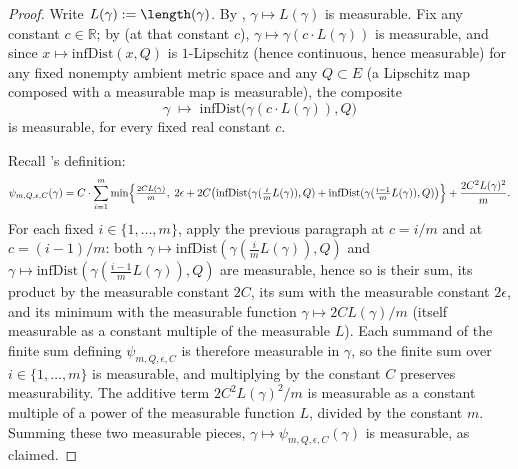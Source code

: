 \begin{proof}
  Write $L(\gamma) := \length(\gamma)$. By , $\gamma \mapsto L(\gamma)$
  is measurable. Fix any constant $c \in \mathbb{R}$; by  (at
  that constant $c$), $\gamma \mapsto \gamma(c \cdot L(\gamma))$ is measurable, and since
  $x \mapsto \mathrm{infDist}(x,Q)$ is $1$-Lipschitz (hence continuous, hence measurable) for any
  fixed nonempty ambient metric space and any $Q \subset E$ (a Lipschitz map composed with a
  measurable map is measurable), the composite
  \[
    \gamma \;\longmapsto\; \mathrm{infDist}\bigl(\gamma(c \cdot L(\gamma)), Q\bigr)
  \]
  is measurable, for every fixed real constant $c$.

  Recall 's definition:
  \[
    \psi_{m,Q,\epsilon,C}(\gamma) = C \cdot \sum_{i=1}^{m} \min\Bigl\{ \tfrac{2C L(\gamma)}{m},\;
      2\epsilon + 2C\bigl(\mathrm{infDist}(\gamma(\tfrac{i}{m}L(\gamma)),Q) +
        \mathrm{infDist}(\gamma(\tfrac{i-1}{m}L(\gamma)),Q)\bigr) \Bigr\} + \frac{2C^2 L(\gamma)^2}{m}
    .
  \]
  For each fixed $i \in \{1,\dots,m\}$, apply the previous paragraph at $c = i/m$ and at
  $c=(i-1)/m$: both $\gamma \mapsto \mathrm{infDist}(\gamma(\tfrac{i}{m}L(\gamma)),Q)$ and
  $\gamma \mapsto \mathrm{infDist}(\gamma(\tfrac{i-1}{m}L(\gamma)),Q)$ are measurable, hence so is
  their sum, its product by the measurable constant $2C$, its sum with the measurable constant
  $2\epsilon$, and its minimum with the measurable function $\gamma \mapsto 2CL(\gamma)/m$ (itself
  measurable as a constant multiple of the measurable $L$). Each summand of the finite sum
  defining $\psi_{m,Q,\epsilon,C}$ is therefore measurable in $\gamma$, so the finite sum over
  $i \in \{1,\dots,m\}$ is measurable, and multiplying by the constant $C$ preserves
  measurability. The additive term $2C^2 L(\gamma)^2/m$ is measurable as a constant multiple of a
  power of the measurable function $L$, divided by the constant $m$. Summing these two measurable
  pieces, $\gamma \mapsto \psi_{m,Q,\epsilon,C}(\gamma)$ is measurable, as claimed.
\end{proof}
